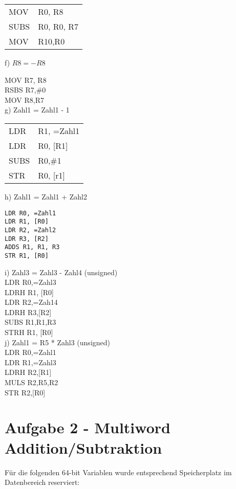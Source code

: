 \documentclass[10pt]{article}
\begin{document}
\begin{center}
\begin{tabular}{ll}
MOV & R0, R8 \\
SUBS & R0, R0, R7 \\
MOV & R10,R0 \\
\end{tabular}
\end{center}

f) $R 8=-R 8$

MOV R7, R8\\
RSBS R7,\#0\\
MOV R8,R7\\
g) Zahl1 = Zahl1 - 1

\begin{center}
\begin{tabular}{ll}
LDR & R1, =Zahl1 \\
LDR & R0, [R1] \\
SUBS & R0,\#1 \\
STR & R0, [r1] \\
\end{tabular}
\end{center}

h) Zahl1 = Zahl1 + Zahl2

\begin{verbatim}
LDR R0, =Zahl1
LDR R1, [R0]
LDR R2, =Zahl2
LDR R3, [R2]
ADDS R1, R1, R3
STR R1, [R0]
\end{verbatim}

i) Zahl3 = Zahl3 - Zahl4 (unsigned)\\
LDR R0,=Zahl3\\[0pt]
LDRH R1, [R0]\\
LDR R2,=Zah14\\[0pt]
LDRH R3,[R2]\\
SUBS R1,R1,R3\\[0pt]
STRH R1, [R0]\\
j) Zahl1 = R5 * Zahl3 (unsigned)\\
LDR R0,=Zahl1\\
LDR R1,=Zahl3\\[0pt]
LDRH R2,[R1]\\
MULS R2,R5,R2\\[0pt]
STR R2,[R0]

\section*{Aufgabe 2 - Multiword Addition/Subtraktion}
Für die folgenden 64-bit Variablen wurde entsprechend Speicherplatz im Datenbereich reserviert:
\end{document}
